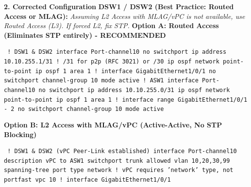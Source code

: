 \documentclass[11pt]{article}
\begin{document}
\begin{exoresolu}
\noindent\textbf{2. Corrected Configuration}
\textbf{DSW1 / DSW2 (Best Practice: Routed Access or MLAG):} \textit{Assuming L2 Access with MLAG/vPC is not available, use Routed Access (L3). If forced L2, fix STP.}
\textbf{Option A: Routed Access (Eliminates STP entirely) - RECOMMENDED}
\begin{flushleft}
\texttt{
! DSW1 \& DSW2\newline
interface Port-channel10\newline
 no switchport\newline
 ip address 10.10.255.1/31  ! /31 for p2p (RFC 3021) or /30\newline
 ip ospf network point-to-point\newline
 ip ospf 1 area 1\newline
!\newline
interface GigabitEthernet1/0/1\newline
 no switchport\newline
 channel-group 10 mode active\newline
\newline
! ASW1\newline
interface Port-channel10\newline
 no switchport\newline
 ip address 10.10.255.0/31\newline
 ip ospf network point-to-point\newline
 ip ospf 1 area 1\newline
!\newline
interface range GigabitEthernet1/0/1 - 2\newline
 no switchport\newline
 channel-group 10 mode active
}
\end{flushleft}
\textbf{Option B: L2 Access with MLAG/vPC (Active-Active, No STP Blocking)}
\begin{flushleft}
\texttt{
! DSW1 \& DSW2 (vPC Peer-Link established)\newline
interface Port-channel10\newline
 description vPC to ASW1\newline
 switchport trunk allowed vlan 10,20,30,99\newline
 spanning-tree port type network  ! vPC requires 'network' type, not portfast\newline
 vpc 10\newline
!\newline
interface GigabitEthernet1/0/1\newline
}
\end{flushleft}
\end{exoresolu}
\end{document}
